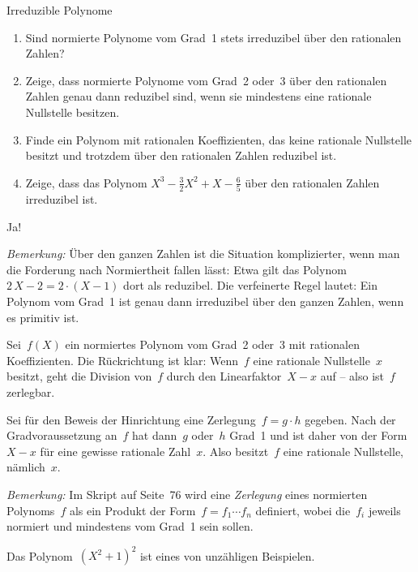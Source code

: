 \documentclass{algblatt}
\begin{document}
\ifloesungen\newpage\fi
\begin{aufgabe}{Irreduzible Polynome}
\begin{enumerate}
\item Sind normierte Polynome vom Grad~1 stets irreduzibel über den rationalen
Zahlen?
\item Zeige, dass normierte Polynome vom Grad~2 oder~3 über den rationalen
Zahlen genau dann reduzibel sind, wenn sie mindestens eine rationale Nullstelle
besitzen.
\item Finde ein Polynom mit rationalen Koeffizienten, das keine rationale
Nullstelle besitzt und trotzdem über den rationalen Zahlen reduzibel ist.
\item Zeige, dass das Polynom $X^3 - \frac{3}{2}X^2 + X - \frac{6}{5}$ über den
rationalen Zahlen irreduzibel ist.
\end{enumerate}

\begin{loesungE}
\item Ja!

\emph{Bemerkung:} Über den ganzen Zahlen ist die Situation komplizierter, wenn
man die Forderung nach Normiertheit fallen lässt: Etwa
gilt das Polynom~$2\,X - 2 = 2 \cdot (X - 1)$ dort als reduzibel. Die
verfeinerte Regel lautet: Ein Polynom vom Grad~1 ist genau dann irreduzibel
über den ganzen Zahlen, wenn es primitiv ist.

\item Sei~$f(X)$ ein normiertes Polynom vom Grad~2 oder~3 mit rationalen
Koeffizienten. Die Rückrichtung ist klar: Wenn~$f$ eine rationale
Nullstelle~$x$ besitzt, geht die Division von~$f$ durch den Linearfaktor~$X-x$
auf -- also ist~$f$ zerlegbar.

Sei für den Beweis der Hinrichtung eine Zerlegung~$f = g \cdot h$ gegeben. Nach
der Gradvoraussetzung an~$f$ hat dann~$g$ oder~$h$ Grad~1 und ist daher von der
Form~$X-x$ für eine gewisse rationale Zahl~$x$. Also besitzt~$f$ eine rationale
Nullstelle, nämlich~$x$.

\emph{Bemerkung:} Im Skript auf Seite~76 wird eine \emph{Zerlegung} eines
normierten Polynoms~$f$ als ein Produkt der Form~$f = f_1 \cdots f_n$
definiert, wobei die~$f_i$ jeweils normiert und mindestens vom Grad~1 sein
sollen.

\item Das Polynom~$(X^2+1)^2$ ist eines von unzähligen Beispielen.


\end{loesungE}
\end{aufgabe}
\end{document}
